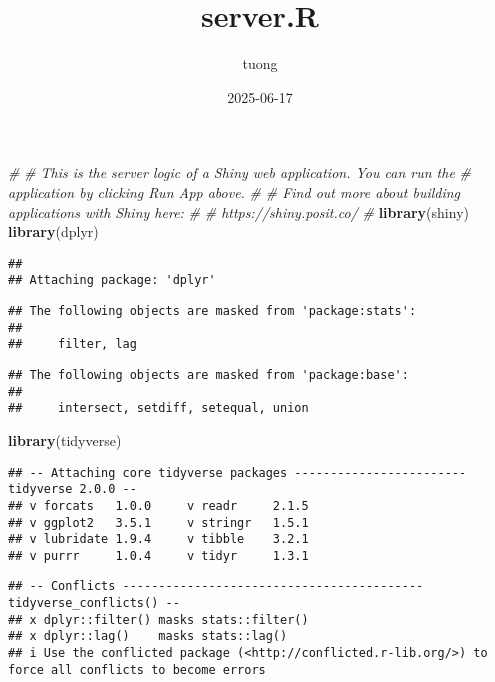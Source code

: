 \documentclass[
]{article}
\title{server.R}
\author{tuong}
\date{2025-06-17}
\newenvironment{Shaded}{\begin{snugshade}}{\end{snugshade}}
\newcommand{\CommentTok}[1]{\textcolor[rgb]{0.56,0.35,0.01}{\textit{#1}}}
\newcommand{\FunctionTok}[1]{\textcolor[rgb]{0.13,0.29,0.53}{\textbf{#1}}}
\newcommand{\NormalTok}[1]{#1}
\begin{document}
\maketitle

\begin{Shaded}
\begin{Highlighting}[]
\CommentTok{\#}
\CommentTok{\# This is the server logic of a Shiny web application. You can run the}
\CommentTok{\# application by clicking \textquotesingle{}Run App\textquotesingle{} above.}
\CommentTok{\#}
\CommentTok{\# Find out more about building applications with Shiny here:}
\CommentTok{\#}
\CommentTok{\#    https://shiny.posit.co/}
\CommentTok{\#}
\FunctionTok{library}\NormalTok{(shiny)}
\FunctionTok{library}\NormalTok{(dplyr)}
\end{Highlighting}
\end{Shaded}

\begin{verbatim}
## 
## Attaching package: 'dplyr'
\end{verbatim}

\begin{verbatim}
## The following objects are masked from 'package:stats':
## 
##     filter, lag
\end{verbatim}

\begin{verbatim}
## The following objects are masked from 'package:base':
## 
##     intersect, setdiff, setequal, union
\end{verbatim}

\begin{Shaded}
\begin{Highlighting}[]
\FunctionTok{library}\NormalTok{(tidyverse)}
\end{Highlighting}
\end{Shaded}

\begin{verbatim}
## -- Attaching core tidyverse packages ------------------------ tidyverse 2.0.0 --
## v forcats   1.0.0     v readr     2.1.5
## v ggplot2   3.5.1     v stringr   1.5.1
## v lubridate 1.9.4     v tibble    3.2.1
## v purrr     1.0.4     v tidyr     1.3.1
\end{verbatim}

\begin{verbatim}
## -- Conflicts ------------------------------------------ tidyverse_conflicts() --
## x dplyr::filter() masks stats::filter()
## x dplyr::lag()    masks stats::lag()
## i Use the conflicted package (<http://conflicted.r-lib.org/>) to force all conflicts to become errors
\end{verbatim}
\end{document}
